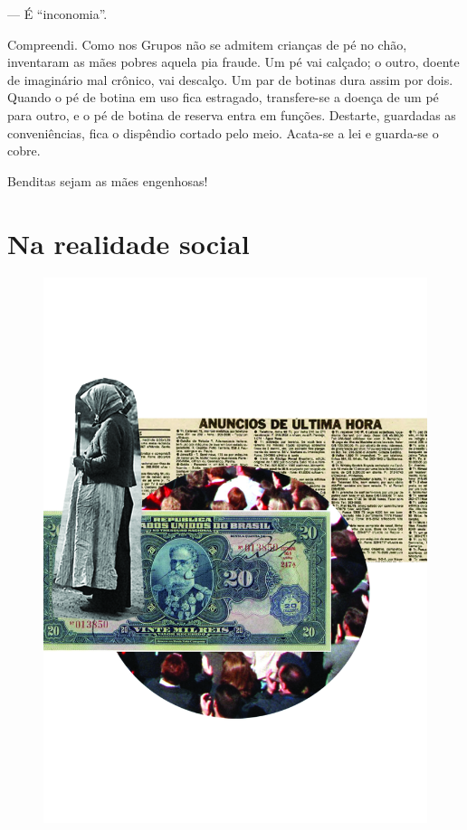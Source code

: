--- É ``inconomia''.

Compreendi. Como nos Grupos não se admitem crianças de pé no chão,
inventaram as mães pobres aquela pia fraude. Um pé vai calçado; o outro,
doente de imaginário mal crônico, vai descalço. Um par de botinas dura
assim por dois. Quando o pé de botina em uso fica estragado,
transfere-se a doença de um pé para outro, e o pé de botina de reserva
entra em funções. Destarte, guardadas as conveniências, fica o dispêndio
cortado pelo meio. Acata-se a lei e guarda-se o cobre.

Benditas sejam as mães engenhosas!

\part{Na realidade social}

\pagebreak
\thispagestyle{empty}
\begin{figure}
\includegraphics[width=\textwidth]{./ilustracoes/05_DONA.jpg}
\end{figure}
\pagebreak

